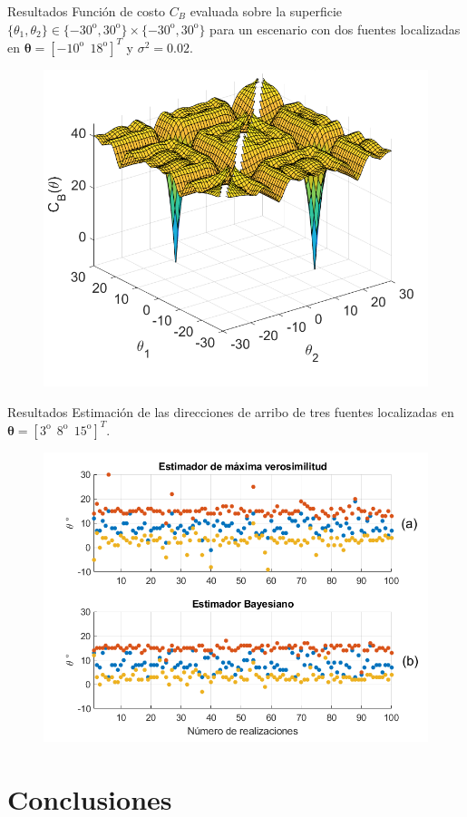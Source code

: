 \documentclass[12pt,aspectratio=169]{beamer}
\begin{document}
	\begin{frame}{Resultados}
		Función de costo $C_{B}$ evaluada sobre la superficie $\{\theta_1,\theta_2\} \in \{-30^{\mathrm{o}}, 30^{\mathrm{o}}\}\times\{-30^{\mathrm{o}}, 30^{\mathrm{o}}\}$ para un escenario con dos fuentes localizadas en $\pmb{\theta} = [-10^{\mathrm{o}}~~18^{\mathrm{o}}]^T$ y $\sigma^2 = 0$.$02$.
		\begin{figure}[h]
			\centering
			\includegraphics[width=0.52\linewidth]{figures/Fig3.png}
		\end{figure}
	\end{frame}
	
	\begin{frame}{Resultados}
		Estimación de las direcciones de arribo de tres fuentes localizadas en $\pmb{\theta} = [3^{\mathrm{o}}~~8^{\mathrm{o}}~~15^{\mathrm{o}}]^T$.				
		\begin{figure}[h]
			\centering
			\includegraphics[width=0.58\linewidth]{figures/Fig21.png}
		\end{figure}
	\end{frame}
	
	
	
	
	
	\section{Conclusiones}
	
\end{document}

